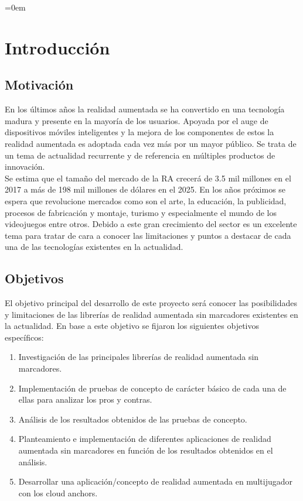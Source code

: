 \parindent=0em
\chapter*{Introducción}
\noindent
\section*{Motivación}
En los últimos años la realidad aumentada se ha convertido en una tecnología madura y presente en la mayoría de los usuarios. Apoyada por el auge de dispositivos móviles inteligentes y la mejora de los componentes de estos la realidad aumentada es adoptada cada vez más por un mayor público. Se trata de un tema de actualidad recurrente y de referencia en múltiples productos de innovación.\\

Se estima que el tamaño del mercado de la RA crecerá de 3.5 mil millones en el 2017 a más de 198 mil millones de dólares en el 2025.\cite{Statista} En los años próximos se espera que revolucione mercados como son el arte, la educación, la publicidad, procesos de fabricación y montaje, turismo y especialmente el mundo de los videojuegos entre otros. Debido a este gran crecimiento del sector es un excelente tema para tratar de cara a conocer las limitaciones y puntos a destacar de cada una de las tecnologías existentes en la actualidad.

\section*{Objetivos}
El objetivo principal del desarrollo de este proyecto será conocer las posibilidades y limitaciones de las librerías de realidad aumentada sin marcadores existentes en la actualidad. En base a este objetivo se fijaron los siguientes objetivos específicos:
\begin{enumerate}
\item Investigación de las principales librerías de realidad aumentada sin marcadores.
\item Implementación de pruebas de concepto de carácter básico de cada una de ellas para analizar los pros y contras.
\item Análisis de los resultados obtenidos de las pruebas de concepto.
\item Planteamiento e implementación de diferentes aplicaciones de realidad aumentada sin marcadores en función de los resultados obtenidos en el análisis.
\item Desarrollar una aplicación/concepto de realidad aumentada en multijugador con los cloud anchors.
\end{enumerate}
\newpage
